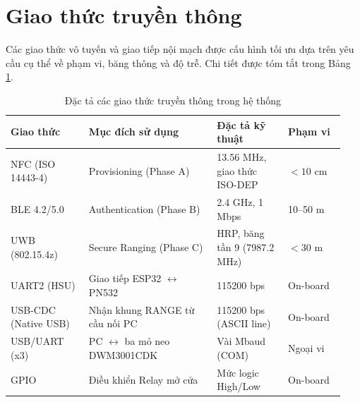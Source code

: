






\section{Giao thức truyền thông}

Các giao thức vô tuyến và giao tiếp nội mạch được cấu hình tối ưu dựa trên yêu cầu cụ thể về phạm vi, băng thông và độ trễ. Chi tiết được tóm tắt trong Bảng \ref{tab:protocols}.

\begin{table}[H]
    \centering
    \renewcommand{\arraystretch}{1.35}
    \setlength{\tabcolsep}{4pt}

    \begin{tabular}{|p{0.22\linewidth}|p{0.36\linewidth}|p{0.2\linewidth}|p{0.16\linewidth}|}
        \hline
        \textbf{Giao thức} &
        \textbf{Mục đích sử dụng} &
        \textbf{Đặc tả kỹ thuật} &
        \textbf{Phạm vi} \\
        \hline

        NFC (ISO 14443-4) &
        Provisioning (Phase A) &
        13.56 MHz, giao thức ISO-DEP &
        $< 10$ cm \\
        \hline

        BLE 4.2/5.0 &
        Authentication (Phase B) &
        2.4 GHz, 1 Mbps &
        10--50 m \\
        \hline

        UWB (802.15.4z) &
        Secure Ranging (Phase C) &
        HRP, băng tần 9 (7987.2 MHz) &
        $< 30$ m \\
        \hline

        UART2 (HSU) &
        Giao tiếp ESP32 $\leftrightarrow$ PN532 &
        115200 bps &
        On-board \\
        \hline

        USB-CDC (Native USB) &
        Nhận khung RANGE từ cầu nối PC &
        115200 bps (ASCII line) &
        On-board \\
        \hline

        USB/UART (x3) &
        PC $\leftrightarrow$ ba mỏ neo DWM3001CDK &
        Vài Mbaud (COM) &
        Ngoại vi \\
        \hline

        GPIO &
        Điều khiển Relay mở cửa &
        Mức logic High/Low &
        On-board \\
        \hline
    \end{tabular}

    \caption{Đặc tả các giao thức truyền thông trong hệ thống}
    \label{tab:protocols}
\end{table}

